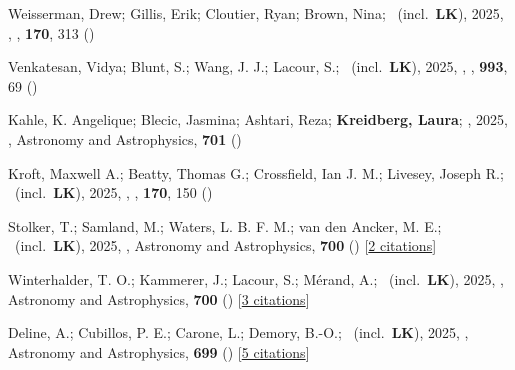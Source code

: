 \item[{\color{numcolor}\scriptsize146}] Weisserman, Drew; Gillis, Erik; Cloutier, Ryan; Brown, Nina; \etal\ (incl.\ \textbf{LK}), 2025, , \aj, \textbf{170}, 313 ()

\item[{\color{numcolor}\scriptsize145}] Venkatesan, Vidya; Blunt, S.; Wang, J. J.; Lacour, S.; \etal\ (incl.\ \textbf{LK}), 2025, , \apj, \textbf{993}, 69 ()

\item[{\color{numcolor}\scriptsize144}] Kahle, K. Angelique; Blecic, Jasmina; Ashtari, Reza; \textbf{Kreidberg, Laura}; \etal, 2025, , Astronomy and Astrophysics, \textbf{701} ()

\item[{\color{numcolor}\scriptsize143}] Kroft, Maxwell A.; Beatty, Thomas G.; Crossfield, Ian J. M.; Livesey, Joseph R.; \etal\ (incl.\ \textbf{LK}), 2025, , \aj, \textbf{170}, 150 ()

\item[{\color{numcolor}\scriptsize142}] Stolker, T.; Samland, M.; Waters, L. B. F. M.; van den Ancker, M. E.; \etal\ (incl.\ \textbf{LK}), 2025, , Astronomy and Astrophysics, \textbf{700} () [\href{https://ui.adsabs.harvard.edu/abs/2025A&A...700A..21S}{2 citations}]

\item[{\color{numcolor}\scriptsize141}] Winterhalder, T. O.; Kammerer, J.; Lacour, S.; M{\'e}rand, A.; \etal\ (incl.\ \textbf{LK}), 2025, , Astronomy and Astrophysics, \textbf{700} () [\href{https://ui.adsabs.harvard.edu/abs/2025A&A...700A...4W}{3 citations}]

\item[{\color{numcolor}\scriptsize140}] Deline, A.; Cubillos, P. E.; Carone, L.; Demory, B.-O.; \etal\ (incl.\ \textbf{LK}), 2025, , Astronomy and Astrophysics, \textbf{699} () [\href{https://ui.adsabs.harvard.edu/abs/2025A&A...699A.150D}{5 citations}]

